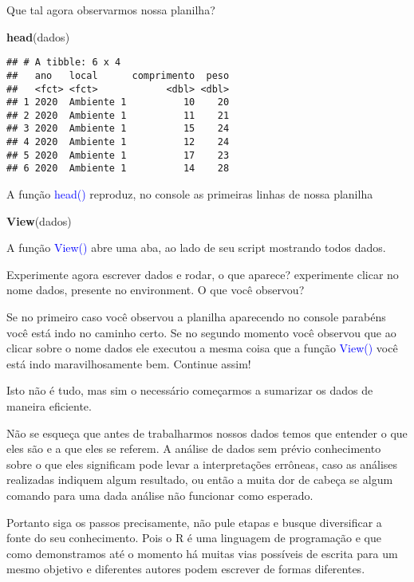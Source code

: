 \documentclass[titlepage, oneside, openany, a4paper]{book}
\newenvironment{Shaded}{\begin{snugshade}}{\end{snugshade}}
\newcommand{\KeywordTok}[1]{\textcolor[rgb]{0.13,0.29,0.53}{\textbf{#1}}}
\newcommand{\NormalTok}[1]{#1}
\begin{document}
Que tal agora observarmos nossa planilha?

\begin{Shaded}
\begin{Highlighting}[]
\KeywordTok{head}\NormalTok{(dados)}
\end{Highlighting}
\end{Shaded}

\begin{verbatim}
## # A tibble: 6 x 4
##   ano   local      comprimento  peso
##   <fct> <fct>            <dbl> <dbl>
## 1 2020  Ambiente 1          10    20
## 2 2020  Ambiente 1          11    21
## 3 2020  Ambiente 1          15    24
## 4 2020  Ambiente 1          12    24
## 5 2020  Ambiente 1          17    23
## 6 2020  Ambiente 1          14    28
\end{verbatim}

A função \textcolor{blue}{head()} reproduz, no console as primeiras linhas de nossa planilha

\begin{Shaded}
\begin{Highlighting}[]
\KeywordTok{View}\NormalTok{(dados)}
\end{Highlighting}
\end{Shaded}

A função \textcolor{blue}{View()} abre uma aba, ao lado de seu script mostrando todos dados.

Experimente agora escrever dados e rodar, o que aparece? experimente clicar no nome dados, presente no environment. O que você observou?

Se no primeiro caso você observou a planilha aparecendo no console parabéns você está indo no caminho certo. Se no segundo momento você observou que ao clicar sobre o nome dados ele executou a mesma coisa que a função \textcolor{blue}{View()} você está indo maravilhosamente bem. Continue assim!

Isto não é tudo, mas sim o necessário começarmos a sumarizar os dados de maneira eficiente.

Não se esqueça que antes de trabalharmos nossos dados temos que entender o que eles são e a que eles se referem. A análise de dados sem prévio conhecimento sobre o que eles significam pode levar a interpretações errôneas, caso as análises realizadas indiquem algum resultado, ou então a muita dor de cabeça se algum comando para uma dada análise não funcionar como esperado.

Portanto siga os passos precisamente, não pule etapas e busque diversificar a fonte do seu conhecimento. Pois o R é uma linguagem de programação e que como demonstramos até o momento há muitas vias possíveis de escrita para um mesmo objetivo e diferentes autores podem escrever de formas diferentes.
\end{document}
